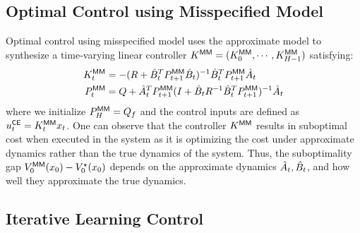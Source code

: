 \subsection{Optimal Control using Misspecified Model}
\label{sec:cert-equiv-contr}

Optimal control using misspecified model uses the
approximate model to synthesize a time-varying linear controller
$K^\mathsf{MM} = (K^\mathsf{MM}_{0}, \cdots, K^\mathsf{MM}_{H-1})$ satisfying:
\begin{align*}
  K^\mathsf{MM}_{t} &= -(R + \hat{B}_{t}^{T}P^\mathsf{MM}_{t+1}\hat{B}_{t})^{-1}\hat{B}_{t}^{T}P^\mathsf{MM}_{t+1}\hat{A}_{t} \\
  P^\mathsf{MM}_{t} &= Q + \hat{A}_{t}^{T}P^\mathsf{MM}_{t+1}(I + \hat{B}_{t} R^{-1}\hat{B}_{t}^{T}P^\mathsf{MM}_{t+1})^{-1}\hat{A}_{t}
\end{align*}
where we initialize $P^\mathsf{MM}_{H} = Q_{f}$ and the control inputs are defined as
$u_{t}^{\mathsf{CE}} = K^\mathsf{MM}_{t}x_{t}$. One can observe that the controller
$K^\mathsf{MM}$ results in suboptimal cost when executed in the system as it is
optimizing the cost under approximate
dynamics rather than the true dynamics of the system. Thus, the suboptimality
gap $V^\mathsf{MM}_{0}(x_{0}) - V^\star_{0}(x_{0})$ depends on the approximate dynamics
$\hat{A}_{t}, \hat{B}_{t}$, and how well they approximate the true dynamics.

\subsection{Iterative Learning Control}
\label{sec:iter-learn-contr-1}

